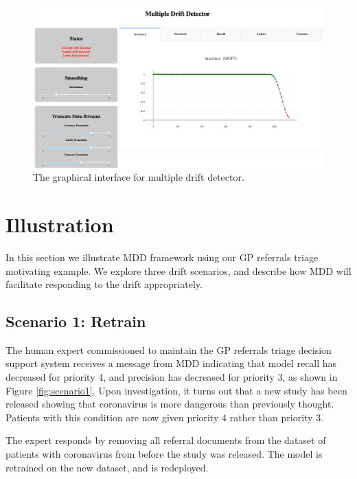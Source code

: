 \begin{figure}
    \centering
    \includegraphics[width=\columnwidth]{images/dash_app.png}
    \caption{The graphical interface for multiple drift detector.}
    \label{fig:dash_app}
\end{figure}


\section{Illustration} \label{mdd:illustration}

In this section we illustrate MDD framework using our GP referrals triage motivating example. We explore three drift scenarios, and describe how MDD will facilitate responding to the drift appropriately. 

\subsection{Scenario 1: Retrain}

The human expert commissioned to maintain the GP referrals triage decision support system receives a message from MDD indicating that model recall has decreased for priority 4, and precision has decreased for priority 3, as shown in Figure \ref{fig:scenario1}. Upon investigation, it turns out that a new study has been released showing that coronavirus is more dangerous than previously thought. Patients with this condition are now given priority 4 rather than priority 3. 

The expert responds by removing all referral documents from the dataset of patients with coronavirus from before the study was released. The model is retrained on the new dataset, and is redeployed.

